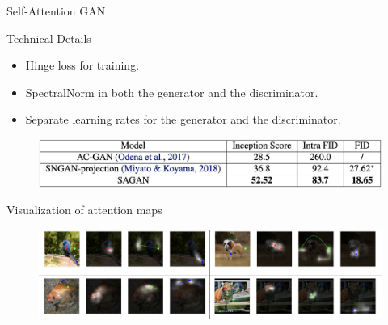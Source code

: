 \begin{frame}{Self-Attention GAN}
	\begin{block}{Technical Details}
		\begin{itemize}
			\item Hinge loss for training.
			\item SpectralNorm in both the generator and the discriminator.
			\item Separate learning rates for the generator and the discriminator.
		\end{itemize}
	\end{block}
	\begin{figure}
		\centering
		\includegraphics[width=0.85\linewidth]{figs/sa_results2}
	\end{figure}
	\vspace{-0.3cm}
	\begin{block}{Visualization of attention maps}
		\begin{figure}
			\centering
			\includegraphics[width=\linewidth]{figs/sa_maps}
		\end{figure}
	\end{block}

\end{frame}
